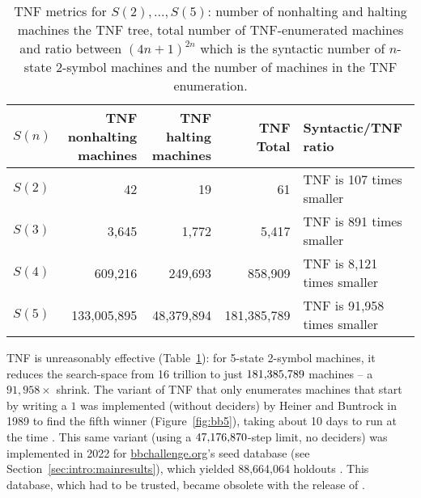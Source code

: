 \begin{table}[h!]
    \centering
    \begin{tabular}{|l|r|r|r|l|}
        \hline
        $S(n)$ & \makecell{TNF nonhalting                                                          \\ machines} & \makecell{TNF halting \\ machines} & TNF Total         & Syntactic/TNF ratio                 \\
        \hline
        $S(2)$ & 42                       & 19         & 61          & TNF is 107 times smaller    \\
        $S(3)$ & 3,645                    & 1,772      & 5,417       & TNF is 891 times smaller    \\
        $S(4)$ & 609,216                  & 249,693    & 858,909     & TNF is 8,121 times smaller  \\
        $S(5)$ & 133,005,895              & 48,379,894 & 181,385,789 & TNF is 91,958 times smaller \\
        \hline
    \end{tabular}

    \caption{TNF metrics for $S(2),\dots,S(5)$: number of nonhalting and halting machines the TNF tree, total number of TNF-enumerated machines and ratio between $(4n+1)^{2n}$ which is the syntactic number of $n$-state 2-symbol machines and the number of machines in the TNF enumeration.}\label{tab:TNF-numbers}
\end{table}

TNF is unreasonably effective (Table~\ref{tab:TNF-numbers}): for 5-state 2-symbol machines, it reduces the search-space from 16 trillion to just $181{,}385{,}789$ machines -- a $91{,}958\times$ shrink. The variant of TNF that only enumerates machines that start by writing a $1$ was implemented (without deciders) by Heiner and Buntrock in 1989 to find the fifth \BBfull winner (Figure~\ref{fig:bb5}), taking about 10 days to run at the time \cite{Marxen_1990}. This same variant (using a $47{,}176{,}870$-step limit, no deciders) was implemented in 2022 for \url{bbchallenge.org}’s seed database (see Section~\ref{sec:intro:mainresults}), which yielded 88,664,064 holdouts  \cite{sterin_2022_14955828}. This database, which had to be trusted, became obsolete with the release of \CoqBB. %

